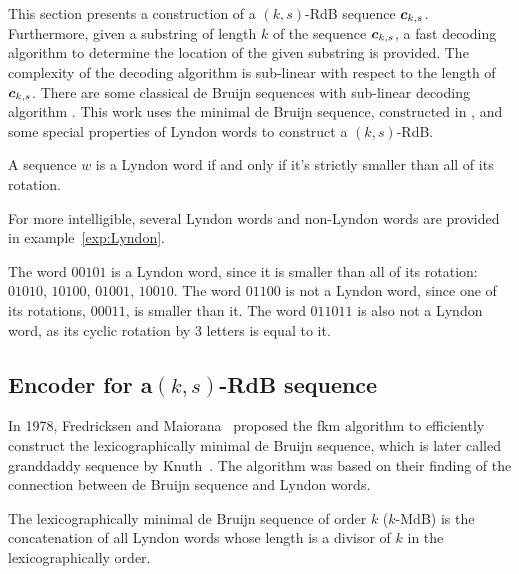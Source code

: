 
This section presents a construction of a $(k,s)$-RdB sequence ${\boldsymbol c}_{k,s}$. Furthermore, given a substring of length $k$ of the sequence ${\boldsymbol c}_{k,s}$, a fast decoding algorithm to determine the location of the given substring is provided. The complexity of the decoding algorithm is sub-linear with respect to the length of ${\boldsymbol c}_{k,s}$. There are some classical de Bruijn sequences with sub-linear decoding algorithm \cite{mitchell1996method,tuliani2001bruijn,kociumaka2016efficient}. This work uses the minimal de Bruijn sequence, constructed in \cite{kociumaka2016efficient,fredricksen1978necklaces}, and some special properties of Lyndon words to construct a $(k,s)$-RdB.

\begin{definition}
    A sequence $w$ is a Lyndon word if and only if it's strictly smaller than all of its rotation.
\end{definition}
For more intelligible, several Lyndon words and non-Lyndon words are provided in example~\ref{exp:Lyndon}.
\begin{example}\label{exp:Lyndon}
    The word $00101$ is a Lyndon word, since it is smaller than all of its rotation: $01010$, $10100$, $01001$, $10010$. The word $01100$ is not a Lyndon word, since one of its rotations, $00011$, is smaller than it. The word $011011$ is also not a Lyndon word, as its cyclic rotation by $3$ letters is equal to it. 
\end{example}

\subsection{Encoder for a\texorpdfstring{$(k,s)$}{(k,s)}-RdB sequence} \label{subsect:encoder}
In 1978, Fredricksen and Maiorana~\cite{fredricksen1978necklaces} proposed the \gls{fkm} algorithm to efficiently construct the lexicographically minimal de Bruijn sequence, which is later called granddaddy sequence by Knuth~\cite{knuth2013art}. The algorithm was based on their finding of the connection between de Bruijn sequence and Lyndon words.

\begin{lemma}\label{lem:FKM}
    The lexicographically minimal de Bruijn sequence of order $k$ ($k$-MdB) is the concatenation of all Lyndon words whose length is a divisor of $k$ in the lexicographically order.
\end{lemma}

